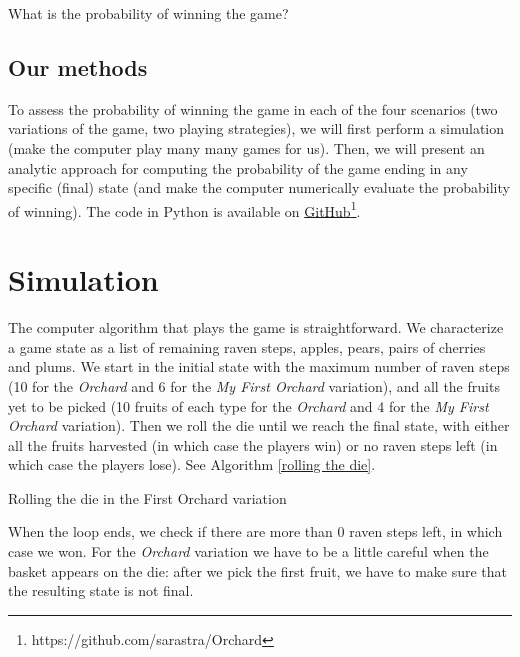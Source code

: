 \documentclass{article}
\begin{document}
What is the probability of winning the game?

\subsection{Our methods}
To assess the probability of winning the game in each of the four scenarios (two variations of the game, two playing strategies), we will first perform a simulation (make the computer play many many games for us). Then, we will present an analytic approach for computing the probability of the game ending in any specific (final) state (and make the computer numerically evaluate the probability of winning). The code in Python is available on \href{https://github.com/sarastra/Orchard}{GitHub}\footnote{https://github.com/sarastra/Orchard}.

\section{Simulation}
\label{sim}

The computer algorithm that plays the game is straightforward. We characterize a game state as a list of remaining raven steps, apples, pears, pairs of cherries and plums. We start in the initial state with the maximum number of raven steps (10 for the \emph{Orchard} and 6 for the \emph{My First Orchard} variation), and all the fruits yet to be picked (10 fruits of each type for the \emph{Orchard} and 4 for the \emph{My First Orchard} variation). Then we roll the die until we reach the final state, with either all the fruits harvested (in which case the players win) or no raven steps left (in which case the players lose). See Algorithm \ref{rolling the die}.

\begin{algorithm}[h]
\SetAlgoLined
{}
\caption{Rolling the die in the First Orchard variation}
\label{rolling the die}
\end{algorithm}

When the loop ends, we check if there are more than 0 raven steps left, in which case we won. For the \emph{Orchard} variation we have to be a little careful when the basket appears on the die: after we pick the first fruit, we have to make sure that the resulting state is not final.
\end{document}
